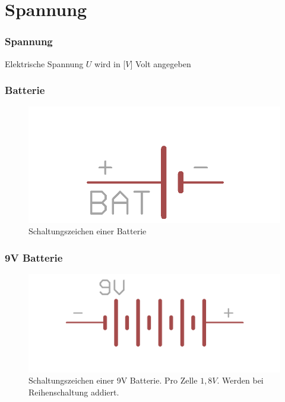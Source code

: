 \section*{Spannung}

\begin{frame}
    \frametitle{Spannung}
    \begin{center}
        Elektrische Spannung $U$ wird in [$V$] Volt angegeben
    \end{center}
\end{frame}

\begin{frame}
    \frametitle{Batterie}
    \begin{center}
 \begin{figure}
	\includegraphics[width=.7\textwidth]{e02/batterieEagle.png}
	 \caption{Schaltungszeichen einer Batterie}
\end{figure}
    \end{center}
\end{frame}

\begin{frame}
    \frametitle{9V Batterie}
    \begin{center}
	 \begin{figure}
	\includegraphics[width=.99\textwidth]{e02/9vBatEagle.png}
    	\caption{Schaltungszeichen einer 9V Batterie. Pro Zelle $1,8V$. Werden bei Reihenschaltung addiert.}
    	\end{figure}
    \end{center}
\end{frame}

